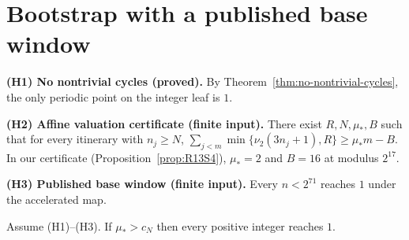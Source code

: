 \section{Bootstrap with a published base window}
\label{sec:bootstrap}

\noindent\textbf{(H1) No nontrivial cycles (proved).}
By Theorem~\ref{thm:no-nontrivial-cycles}, the only periodic point on the integer leaf is $1$.

\medskip\noindent
\textbf{(H2) Affine valuation certificate (finite input).}
There exist $R,N,\mu_*,B$ such that for every itinerary with $n_j\ge N$,
\(
\sum_{j<m}\min\{\nu_2(3n_j+1),R\}\ge \mu_* m - B.
\)
In our certificate (Proposition~\ref{prop:R13S4}), $\mu_*=2$ and $B=16$ at modulus $2^{17}$.

\medskip\noindent
\textbf{(H3) Published base window (finite input).}
Every $n<2^{71}$ reaches $1$ under the accelerated map.

\begin{theorem}\label{thm:bootstrap}
Assume \textup{(H1)}–\textup{(H3)}. If $\mu_*>c_N$ then every positive integer reaches $1$.
\end{theorem}
